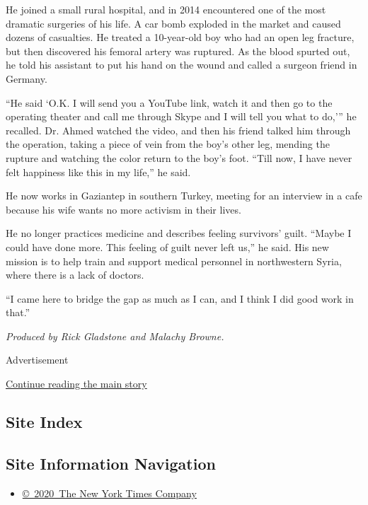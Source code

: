 He joined a small rural hospital, and in 2014 encountered one of the
most dramatic surgeries of his life. A car bomb exploded in the market
and caused dozens of casualties. He treated a 10-year-old boy who had an
open leg fracture, but then discovered his femoral artery was ruptured.
As the blood spurted out, he told his assistant to put his hand on the
wound and called a surgeon friend in Germany.

``He said `O.K. I will send you a YouTube link, watch it and then go to
the operating theater and call me through Skype and I will tell you what
to do,''' he recalled. Dr. Ahmed watched the video, and then his friend
talked him through the operation, taking a piece of vein from the boy's
other leg, mending the rupture and watching the color return to the
boy's foot. ``Till now, I have never felt happiness like this in my
life,'' he said.

He now works in Gaziantep in southern Turkey, meeting for an interview
in a cafe because his wife wants no more activism in their lives.

He no longer practices medicine and describes feeling survivors' guilt.
``Maybe I could have done more. This feeling of guilt never left us,''
he said. His new mission is to help train and support medical personnel
in northwestern Syria, where there is a lack of doctors.

``I came here to bridge the gap as much as I can, and I think I did good
work in that.''

\emph{Produced by Rick Gladstone and Malachy Browne.}

Advertisement

\protect\hyperlink{after-bottom}{Continue reading the main story}

\hypertarget{site-index}{%
\subsection{Site Index}\label{site-index}}

\hypertarget{site-information-navigation}{%
\subsection{Site Information
Navigation}\label{site-information-navigation}}

\begin{itemize}
\tightlist
\item
  \href{https://help.nytimes.com/hc/en-us/articles/115014792127-Copyright-notice}{©~2020~The
  New York Times Company}
\end{itemize}

